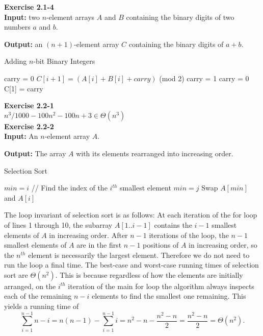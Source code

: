 \documentclass{article}
\begin{document}
\noindent\textbf{ Exercise 2.1-4} \\

\textbf{Input:} two $n$-element arrays $A$ and $B$ containing the binary digits of two numbers $a$ and $b$.  

\textbf{Output:} an $(n+1)$-element array $C$ containing the binary digits of $a+b$.
\begin{algorithm}
\caption{Adding $n$-bit Binary Integers}
\begin{algorithmic}[1]
\State carry = 0
	\State $C[i+1] = (A[i] + B[i] + carry)$ (mod 2)
		\State carry = 1
	\Else
	\State carry = 0
	\EndIf
\EndFor
\State C[1] = carry
\end{algorithmic}
\end{algorithm}

\noindent\textbf{ Exercise 2.2-1}\\

$n^3/1000 - 100n^2-100n +3 \in \Theta(n^3)$ \\

\noindent\textbf{ Exercise 2.2-2}\\

\textbf{Input:} An $n$-element array $A$.

\textbf{Output:} The array $A$ with its elements rearranged into increasing order.

\begin{algorithm}
\caption{Selection Sort}
\begin{algorithmic}[1]
	\State $min = i$
	\State // Find the index of the $i^{th}$ smallest element
			\State $min = j$
		\EndIf
	\EndFor
	\State Swap $A[min]$ and $A[i]$
\EndFor
\end{algorithmic}
\end{algorithm}

The loop invariant of selection sort is as follows:  At each iteration of the for loop of lines 1 through 10, the subarray $A[1..i-1]$ contains the $i-1$ smallest elements of $A$ in increasing order.  After $n-1$ iterations of the loop, the $n-1$ smallest elements of $A$ are in the first $n-1$ positions of $A$ in increasing order, so the $n^{th}$ element is necessarily the largest element.  Therefore we do not need to run the loop a final time.  The best-case and worst-case running times of selection sort are $\Theta(n^2)$.  This is because regardless of how the elements are initially arranged, on the $i^{th}$ iteration of the main for loop the algorithm always inspects each of the remaining $n-i$ elements to find the smallest one remaining.  This yields a running time of 
\[ \sum_{i=1}^{n-1} n-i = n(n-1) - \sum_{i=1}^{n-1} i = n^2 - n - \frac{n^2 - n}{2} = \frac{n^2 - n}{2} = \Theta(n^2).\]
\end{document}
